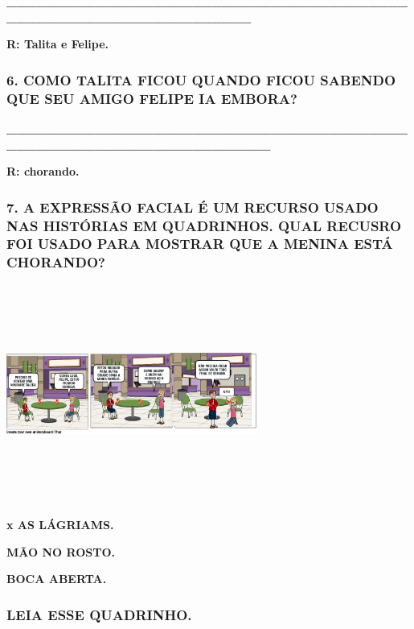 \textbf{\_\_\_\_\_\_\_\_\_\_\_\_\_\_\_\_\_\_\_\_\_\_\_\_\_\_\_\_\_\_\_\_\_\_\_\_\_\_\_\_\_\_\_\_\_\_\_\_\_\_\_\_\_\_\_\_\_\_\_\_\_\_\_\_\_\_}

\textbf{R: Talita e Felipe.}

\subsubsection{6. COMO TALITA FICOU QUANDO FICOU SABENDO QUE SEU AMIGO
FELIPE IA
EMBORA?}\label{como-talita-ficou-quando-ficou-sabendo-que-seu-amigo-felipe-ia-embora}

\textbf{\_\_\_\_\_\_\_\_\_\_\_\_\_\_\_\_\_\_\_\_\_\_\_\_\_\_\_\_\_\_\_\_\_\_\_\_\_\_\_\_\_\_\_\_\_\_\_\_\_\_\_\_\_\_\_\_\_\_\_\_\_\_\_\_\_\_\_\_}

\textbf{R: chorando.}\protect\hypertarget{_heading=h.nqfz6n7t1lqi}{}{}

\subsubsection{7. A EXPRESSÃO FACIAL É UM RECURSO USADO NAS HISTÓRIAS EM
QUADRINHOS. QUAL RECUSRO FOI USADO PARA MOSTRAR QUE A MENINA ESTÁ
CHORANDO?}\label{a-expressuxe3o-facial-uxe9-um-recurso-usado-nas-histuxf3rias-em-quadrinhos.-qual-recusro-foi-usado-para-mostrar-que-a-menina-estuxe1-chorando}

\includegraphics[width=3.23889in,height=2.81042in]{media/image173.png}

\protect\hypertarget{_heading=h.ihv636}{}{}

\textbf{x AS LÁGRIAMS.}

\textbf{MÃO NO ROSTO.}

\textbf{BOCA ABERTA.}

\subsubsection{LEIA ESSE QUADRINHO.}\label{leia-esse-quadrinho.}

